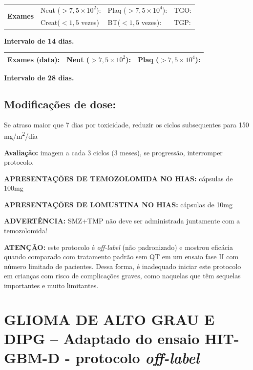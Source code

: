 \documentclass[11pt,a4paper,oldfontcommands]{memoir}
\begin{document}
\begin{center}
\begin{table}[H]
\begin{tabular}{p{1cm}p{5cm}|p{1cm}|p{4.5cm}|p{2cm}}
    \hline
    \multicolumn{1}{c|}{\multirow{2}{*}{\textbf{Exames}}}&\multicolumn{2}{l|}{Neut (\(>7,5\times10^2\)):}&{Plaq (\(>7,5\times10^4\)):}&{TGO:}\\
    \cline{2-5}
    \multicolumn{1}{c|}{\multirow{2}{*}{{}}}&\multicolumn{2}{l|}{Creat(\(<1,5\) vezes)}&{BT(\(<1,5\) vezes):}&{TGP:}
    \\
    \hline
\end{tabular}
\end{table}
\textbf{Intervalo de 14 dias.}
\begin{table}[H]
\begin{tabular}{p{5cm}|p{5cm}|p{4.7cm}}
    \hline
    \textbf{Exames (data):}&{Neut (\(>7,5\times10^2\)):}&{Plaq (\(>7,5\times10^4\)):}
    \\
    \hline
\end{tabular}
\end{table}
\textbf{Intervalo de 28 dias.}
\end{center}


\subsection{Modificações de dose:}
Se atraso maior que 7 dias por toxicidade, reduzir os ciclos subsequentes para 150 mg/m\textsuperscript{2}/dia

\textbf{Avaliação:} imagem a cada 3 ciclos (3 meses), se progressão, interromper protocolo.

\textbf{APRESENTAÇÕES DE TEMOZOLOMIDA NO HIAS:} cápsulas de 100mg

\textbf{APRESENTAÇÕES DE LOMUSTINA NO HIAS:} cápsulas de 10mg

\textbf{ADVERTÊNCIA:} SMZ+TMP não deve ser administrada juntamente com a temozolomida!

\textbf{ATENÇÃO:} este protocolo é \textit{off-label} (não padronizado) e mostrou eficácia quando comparado com tratamento padrão sem QT em um ensaio fase II com número limitado de pacientes. Dessa forma, é inadequado iniciar este protocolo em crianças com risco de complicações graves, como naquelas que têm sequelas importantes e muito limitantes.

\cleardoublepage

\section{GLIOMA DE ALTO GRAU E DIPG -- Adaptado do ensaio HIT-GBM-D - protocolo \textit{off-label}}
{\let\thefootnote\relax{}}
\end{document}
